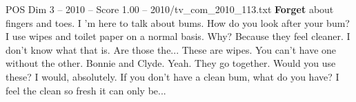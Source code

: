 \begin{textsample}{POS Dim 3 – 2010 – Score 1.00 – 2010/tv\_com\_2010\_113.txt}  \label{ex:f3_pos_046}
\textbf{Forget} about fingers and toes.
I 'm here to talk about bums.
How do you look after your bum?
I use wipes and toilet paper on a normal basis.
Why?
Because they feel cleaner.
I don't know what that is.
Are those the...
These are wipes.
You can't have one without the other.
Bonnie and Clyde.
Yeah.
They go together.
Would you use these?
I would, absolutely.
If you don't have a clean bum, what do you have?
I feel the clean so fresh it can only be...

\end{textsample}
